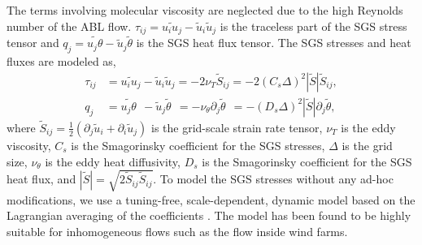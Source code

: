 \documentclass[%
 aip,
 amsmath,amssymb,
preprint,%
author-numerical,%
]{revtex4-1}
\begin{document}
The terms involving molecular viscosity are neglected due to the high Reynolds number of the ABL flow. $\tau_{\mathit{ij}}=\widetilde{u_{\mathit{i}}u_{\mathit{j}}}-\widetilde{u}_\mathit{i}\widetilde{u}_\mathit{j}$ is the traceless part of the SGS stress tensor and $q_\mathit{j}=\widetilde{u_\mathit{j}\theta}-\widetilde{u}_\mathit{j}\widetilde{\theta}$ is the SGS heat flux tensor. The SGS stresses and heat fluxes are modeled as,
%
\begin{align}
 \tau_{\mathit{ij}}&=\widetilde{u_{\mathit{i}}u_{\mathit{j}}}-\widetilde{u}_\mathit{i}\widetilde{u}_\mathit{j}=-2\nu_{T}\widetilde{S}_{ij}=-2(C_s\Delta)^2|\widetilde{S}|\widetilde{S}_{ij},\label{eqn4}\\
 q_\mathit{j}&=\widetilde{u_\mathit{j}\theta}~~-\widetilde{u}_\mathit{j}\widetilde{\theta}~~=-\nu_\theta\partial_j\widetilde{\theta}~~=-(D_s\Delta)^2|\widetilde{S}|\partial_j\widetilde{\theta},\label{eqn5}
\end{align}
%
where $\widetilde{S}_{ij}=\frac{1}{2}\left(\partial_j{\widetilde{u}_i} + \partial_i{\widetilde{u}_j}\right)$ is the grid-scale strain rate tensor, $\nu_T$ is the eddy viscosity, $C_s$ is the Smagorinsky coefficient for the SGS stresses, $\Delta$ is the grid size, $\nu_\theta$ is the eddy heat diffusivity, $D_s$ is the Smagorinsky coefficient for the SGS heat flux, and $|\widetilde{S}| = \sqrt{2\widetilde{S}_{ij}\widetilde{S}_{ij}}$. To model the SGS stresses without any ad-hoc modifications, we use a tuning-free, scale-dependent, dynamic model based on the Lagrangian averaging of the coefficients \cite{bou05, sto06, sto08}. The model has been found to be highly suitable for inhomogeneous flows such as the flow inside wind farms\cite{ste16}. 
\end{document}
